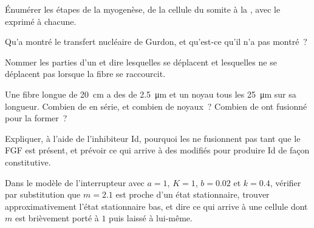 \begin{exercise}[$\star$]\label{exo:b2:cell-differentiation:2}
Énumérer les étapes de la myogenèse, de la cellule du somite à la , avec le  exprimé à chacune.
\end{exercise}

\begin{exercise}[$\star$]\label{exo:b2:cell-differentiation:3}
Qu'a montré le transfert nucléaire de Gurdon, et qu'est-ce qu'il n'a
pas montré~?
\end{exercise}

\begin{exercise}[$\star$]\label{exo:b2:cell-differentiation:4}
Nommer les parties d'un  et dire lesquelles se déplacent et
lesquelles ne se déplacent pas lorsque la fibre se raccourcit.
\end{exercise}

\begin{exercise}[$\star\star$]\label{exo:b2:cell-differentiation:5}
Une fibre longue de \qty{20}{cm} a des  de \qty{2.5}{\micro m}
et un noyau tous les \qty{25}{\micro m} sur sa longueur. Combien de
 en série, et combien de noyaux~? Combien de  ont
fusionné pour la former~?
\end{exercise}

\begin{exercise}[$\star\star$]\label{exo:b2:cell-differentiation:6}
Expliquer, à l'aide de l'inhibiteur Id, pourquoi les  ne
fusionnent pas tant que le FGF est présent, et prévoir ce qui arrive à
des  modifiés pour produire Id de façon constitutive.
\end{exercise}

\begin{exercise}[$\star\star$]\label{exo:b2:cell-differentiation:7}
Dans le modèle de l'interrupteur avec $a = 1$, $K = 1$, $b = 0.02$ et
$k = 0.4$, vérifier par substitution que $m = 2.1$ est proche d'un état
stationnaire, trouver approximativement l'état stationnaire bas, et dire
ce qui arrive à une cellule dont $m$ est brièvement porté à $1$ puis
laissé à lui-même.
\end{exercise}

